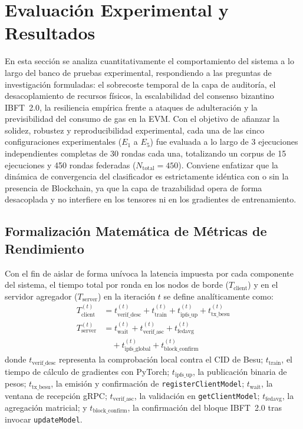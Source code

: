 \section{Evaluación Experimental y Resultados}
\label{sec:evaluacion}

En esta sección se analiza cuantitativamente el comportamiento del sistema a lo largo del banco de pruebas experimental, respondiendo a las preguntas de investigación formuladas: el sobrecoste temporal de la capa de auditoría, el desacoplamiento de recursos físicos, la escalabilidad del consenso bizantino IBFT~2.0, la resiliencia empírica frente a ataques de adulteración y la previsibilidad del consumo de gas en la EVM. Con el objetivo de afianzar la solidez, robustez y reproducibilidad experimental, cada una de las cinco configuraciones experimentales ($E_1$ a $E_5$) fue evaluada a lo largo de 3 ejecuciones independientes completas de 30 rondas cada una, totalizando un corpus de 15 ejecuciones y 450 rondas federadas ($N_{\text{total}} = 450$). Conviene enfatizar que la dinámica de convergencia del clasificador es estrictamente idéntica con o sin la presencia de Blockchain, ya que la capa de trazabilidad opera de forma desacoplada y no interfiere en los tensores ni en los gradientes de entrenamiento.

\subsection{Formalización Matemática de Métricas de Rendimiento}
Con el fin de aislar de forma unívoca la latencia impuesta por cada componente del sistema, el tiempo total por ronda en los nodos de borde ($T_{\text{client}}$) y en el servidor agregador ($T_{\text{server}}$) en la iteración $t$ se define analíticamente como:
\begin{align}
T_{\text{client}}^{(t)} &= t_{\text{verif\_desc}}^{(t)} + t_{\text{train}}^{(t)} + t_{\text{ipfs\_up}}^{(t)} + t_{\text{tx\_besu}}^{(t)} \label{eq:t_client} \\
T_{\text{server}}^{(t)} &= t_{\text{wait}}^{(t)} + t_{\text{verif\_asc}}^{(t)} + t_{\text{fedavg}}^{(t)} \nonumber \\
&\quad + t_{\text{ipfs\_global}}^{(t)} + t_{\text{block\_confirm}}^{(t)} \label{eq:t_server}
\end{align}
donde $t_{\text{verif\_desc}}$ representa la comprobación local contra el CID de Besu; $t_{\text{train}}$, el tiempo de cálculo de gradientes con PyTorch; $t_{\text{ipfs\_up}}$, la publicación binaria de pesos; $t_{\text{tx\_besu}}$, la emisión y confirmación de \texttt{registerClientModel}; $t_{\text{wait}}$, la ventana de recepción gRPC; $t_{\text{verif\_asc}}$, la validación en \texttt{getClientModel}; $t_{\text{fedavg}}$, la agregación matricial; y $t_{\text{block\_confirm}}$, la confirmación del bloque IBFT~2.0 tras invocar \texttt{updateModel}.

